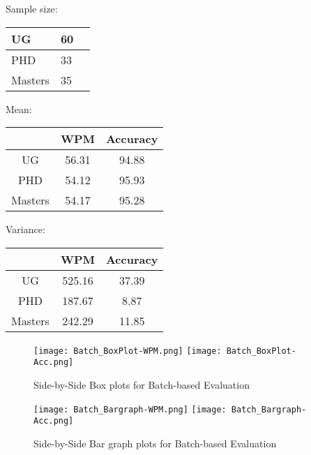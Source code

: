 \documentclass[12pt,a4paper]{report}
\begin{document}
\vspace{2mm}
\begin{center}
Sample size:
\begin{tabular}{ | m{4em} | m{1cm}| m{1cm} | }
  \hline
  UG & 60 \\ 
  \hline
  PHD & 33 \\
  \hline
  Masters & 35 \\
  \hline
\end{tabular}
\end{center}

\begin{center}
Mean:
\begin{tabular}{ |c|c|c|}
  \hline
   & WPM & Accuracy \\
  \hline
  UG & 56.31 & 94.88 \\ 
  \hline
  PHD &  54.12 & 95.93 \\
  \hline
  Masters & 54.17 & 95.28 \\
  \hline
\end{tabular}
\end{center}

\begin{center}
Variance:
\begin{tabular}{ |c|c|c|}
  \hline
   & WPM & Accuracy \\
  \hline
  UG & 525.16 & 37.39 \\ 
  \hline
  PHD &  187.67 & 8.87 \\
  \hline
  Masters & 242.29 & 11.85 \\
  \hline
\end{tabular}
\end{center}



\begin{figure}[h]
    \centering
    \texttt{[image: Batch\_BoxPlot-WPM.png]}
    \texttt{[image: Batch\_BoxPlot-Acc.png]}
    \caption{Side-by-Side Box plots for Batch-based Evaluation}
\end{figure}
\begin{figure}[h]
    \centering
    \texttt{[image: Batch\_Bargraph-WPM.png]}
    \texttt{[image: Batch\_Bargraph-Acc.png]}
    \caption{Side-by-Side Bar graph plots for Batch-based Evaluation}
\end{figure}

\newpage
\end{document}
